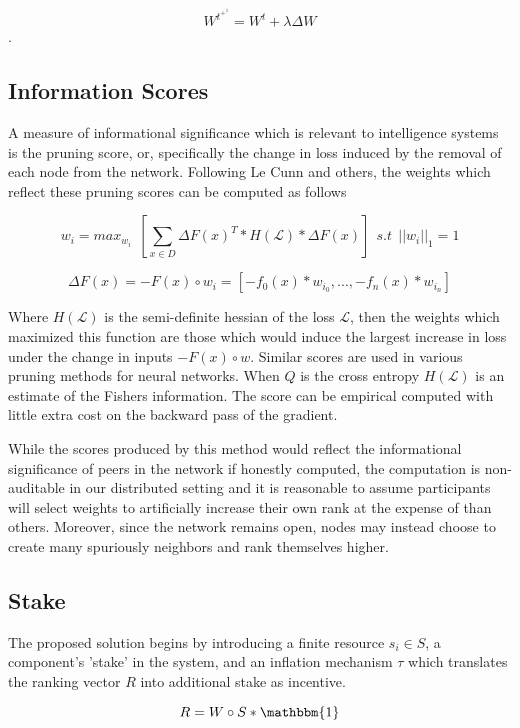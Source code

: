 \documentclass{article}
\begin{document}
\[ W^t^+^1 = W^t + \lambda \Delta W \].

\subsection{Information Scores}

A measure of informational significance which is relevant to intelligence systems is the pruning score, or, specifically the change in loss induced by the removal of each node from the network. Following Le Cunn and others, the weights which reflect these pruning scores can be computed as follows
\bigskip


\[ w_i = max_w_i \ \ [ \sum_{x \in D} \Delta F(x)^T * H (\mathcal{L}) * \Delta F(x) ] \ \ s.t \ \  ||w_i||_1 = 1 \]

\bigskip

\[ \Delta F (x) = -F(x) \circ w_i = [-f_0(x) * w_i_0, ..., -f_n(x) * w_i_n] \]


Where $H(\mathcal{L})$ is the semi-definite hessian of the loss $\mathcal{L}$, then the weights which maximized this function are those which would induce the largest increase in loss under the change in inputs $-F(x) \circ w$. Similar scores are used in various pruning methods for neural networks. When $Q$ is the cross entropy $H(\mathcal{L})$ is an estimate of the Fishers information. The score can be empirical computed with little extra cost on the backward pass of the gradient.
\bigskip

While the scores produced by this method would reflect the informational significance of peers in the network if honestly computed, the computation is non-auditable in our distributed setting and it is reasonable to assume participants will select weights to artificially increase their own rank at the expense of than others. Moreover, since the network remains open, nodes may instead choose to create many spuriously neighbors and rank themselves higher. 
\bigskip


\subsection{Stake}

The proposed solution begins by introducing a finite resource $s_i \in S$, a component's 'stake' in the system, and an inflation mechanism $\tau$ which translates the ranking vector $R$ into additional stake as incentive. 
\bigskip

\[ R = W \circ S * \mathbbm{1} \] 
\end{document}
